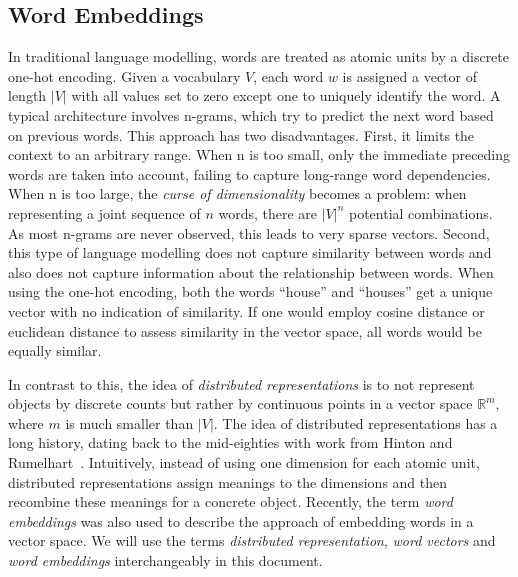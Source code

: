 \documentclass{sig-alternate-05-2015}
\begin{document}

\subsection{Word Embeddings}

In traditional language modelling, words are treated as atomic units by a discrete one-hot encoding.
Given a vocabulary $V$, each word $w$ is assigned a vector of length $|V|$ with all values set to zero except one to uniquely identify the word.
A typical architecture involves n-grams, which try to predict the next word based on previous words.
This approach has two disadvantages.
First, it limits the context to an arbitrary range.
When n is too small, only the immediate preceding words are taken into account, failing to capture long-range word dependencies.
When n is too large, the \emph{curse of dimensionality} becomes a problem: when representing a joint sequence of $n$ words, there are $|V|^n$ potential combinations.
As most n-grams are never observed, this leads to very sparse vectors.
Second, this type of language modelling does not capture similarity between words and also does not capture information about the relationship between words.
When using the one-hot encoding, both the words ``house'' and ``houses'' get a unique vector with no indication of similarity.
If one would employ cosine distance or euclidean distance to assess similarity in the vector space, all words would be equally similar.

In contrast to this, the idea of \emph{distributed representations} is to not represent objects by discrete counts but rather by continuous points in a vector space $\mathbb{R}^m$, where $m$ is much smaller than $|V|$.
The idea of distributed representations has a long history, dating back to the mid-eighties with work from Hinton and Rumelhart~\cite{Hinton1986,Rumelhart1988}.
Intuitively, instead of using one dimension for each atomic unit, distributed representations assign meanings to the dimensions and then recombine these meanings for a concrete object.
Recently, the term \emph{word embeddings} was also used to describe the approach of embedding words in a vector space.
We will use the terms \emph{distributed representation}, \emph{word vectors} and \emph{word embeddings} interchangeably in this document.
\end{document}
